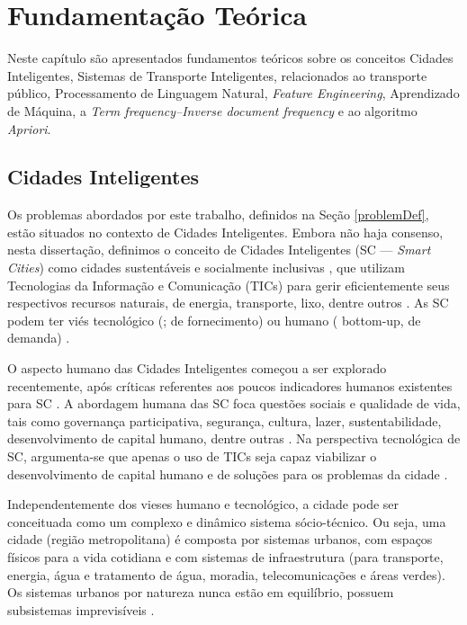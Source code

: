 \documentclass[
	12pt,				%
	oneside,			%
	a4paper,			%
	english,			%
	brazil				%
	]{abntex2ppgsi}
\begin{document}
{%

\chapter{Fundamentação Teórica}
\label{fundamentacao}
Neste capítulo são apresentados fundamentos teóricos sobre os conceitos Cidades Inteligentes, Sistemas de Transporte Inteligentes, relacionados ao transporte público, Processamento de Linguagem Natural, \textit{Feature Engineering}, Aprendizado de Máquina, a \textit{Term frequency–Inverse document frequency} e ao algoritmo \textit{Apriori}.

\section{Cidades Inteligentes}
\label{smartCities}

Os problemas abordados por este trabalho, definidos na Seção \ref{problemDef}, estão situados no contexto de Cidades Inteligentes. Embora não haja consenso, nesta dissertação, definimos o conceito de Cidades Inteligentes (SC --- \textit{Smart Cities}) como cidades sustentáveis e socialmente inclusivas \cite{Wang2017}, que utilizam Tecnologias da Informação e Comunicação (TICs) para gerir eficientemente seus respectivos recursos naturais, de energia, transporte, lixo, dentre outros \cite{Ahvenniemi2017}. As SC podem ter viés tecnológico (; de fornecimento) ou humano ( bottom-up, de demanda) \cite{Kummitha2017}. 

O aspecto humano das Cidades Inteligentes começou a ser explorado recentemente, após críticas referentes aos poucos indicadores humanos existentes para SC \cite{Ahvenniemi2017} \cite{Finger2017}. A abordagem humana das SC foca questões sociais e qualidade de vida, tais como governança participativa, segurança, cultura, lazer, sustentabilidade, desenvolvimento de capital humano, dentre outras  \cite{Ahvenniemi2017}. Na perspectiva tecnológica de SC, argumenta-se que apenas o uso de TICs seja capaz viabilizar o desenvolvimento de capital humano e de soluções para os problemas da cidade \cite{Kummitha2017}.

Independentemente dos vieses humano e tecnológico, a cidade pode ser conceituada como um complexo e dinâmico sistema sócio-técnico. Ou seja, uma cidade (região metropolitana) é composta por sistemas urbanos, com espaços físicos para a vida cotidiana e com sistemas de infraestrutura (para transporte, energia, água e tratamento de água, moradia, telecomunicações e áreas verdes). Os sistemas urbanos por natureza nunca estão em equilíbrio, possuem subsistemas imprevisíveis \cite{Finger2017}.

}
\end{document}

